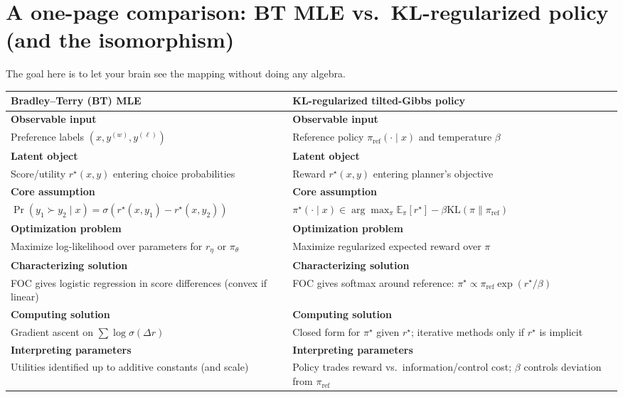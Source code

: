 \documentclass[11pt]{article}
\newcommand{\E}{\mathbb{E}}
\newcommand{\KL}{\mathrm{KL}}
\newcommand{\1}{\mathbf{1}}
\newcommand{\sigmoid}{\sigma}
\theoremstyle{plain}
\theoremstyle{definition}
\theoremstyle{remark}
\begin{document}
\section{A one-page comparison: BT MLE vs.\ KL-regularized policy (and the isomorphism)}
The goal here is to let your brain see the mapping without doing any algebra.

\begin{center}
\renewcommand{\arraystretch}{1.25}
\begin{tabularx}{\textwidth}{@{}Y Y@{}}
\toprule
\textbf{Bradley--Terry (BT) MLE} & \textbf{KL-regularized tilted-Gibbs policy} \\\midrule
\textbf{Observable input} &
\textbf{Observable input} \\
Preference labels $(x, y^{(w)}, y^{(\ell)})$ & Reference policy $\pi_{\mathrm{ref}}(\cdot\mid x)$ and temperature $\beta$ \\
\midrule
\textbf{Latent object} &
\textbf{Latent object} \\
Score/utility $r^\star(x,y)$ entering choice probabilities & Reward $r^\star(x,y)$ entering planner's objective \\
\midrule
\textbf{Core assumption} &
\textbf{Core assumption} \\
$\Pr(y_1\succ y_2\mid x)=\sigmoid(r^\star(x,y_1)-r^\star(x,y_2))$ & $\pi^\star(\cdot\mid x)\in\arg\max_\pi \E_\pi[r^\star]-\beta\KL(\pi\|\pi_{\mathrm{ref}})$ \\
\midrule
\textbf{Optimization problem} &
\textbf{Optimization problem} \\
Maximize log-likelihood over parameters for $r_\eta$ or $\pi_\theta$ &
Maximize regularized expected reward over $\pi$ \\
\midrule
\textbf{Characterizing solution} &
\textbf{Characterizing solution} \\
FOC gives logistic regression in score differences (convex if linear) &
FOC gives softmax around reference: $\pi^\star \propto \pi_{\mathrm{ref}}\exp(r^\star/\beta)$ \\
\midrule
\textbf{Computing solution} &
\textbf{Computing solution} \\
Gradient ascent on $\sum\log\sigmoid(\Delta r)$ &
Closed form for $\pi^\star$ given $r^\star$; iterative methods only if $r^\star$ is implicit \\
\midrule
\textbf{Interpreting parameters} &
\textbf{Interpreting parameters} \\
Utilities identified up to additive constants (and scale) &
Policy trades reward vs.\ information/control cost; $\beta$ controls deviation from $\pi_{\mathrm{ref}}$ \\

\end{tabularx}
\end{center}
\end{document}
